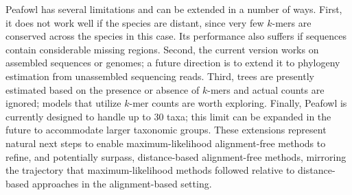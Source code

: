 \documentclass[11pt]{article}
\begin{document}
Peafowl has several limitations and can be extended in a number of ways. First, it does not work well if the species are distant, since very few $k$-mers are conserved across the species in this case. Its performance also suffers if sequences contain considerable missing regions. Second, the current version works on assembled sequences or genomes; a future direction is to extend it to phylogeny estimation from unassembled sequencing reads. Third, trees are presently estimated based on the presence or absence of $k$-mers and actual counts are ignored; models that utilize $k$-mer counts are worth exploring. Finally, Peafowl is currently designed to handle up to 30 taxa; this limit can be expanded in the future to accommodate larger taxonomic groups. These extensions represent natural next steps to enable maximum-likelihood alignment-free methods to refine, and potentially surpass, distance-based alignment-free methods, mirroring the trajectory that maximum-likelihood methods followed relative to distance-based approaches in the alignment-based setting.
\end{document}
